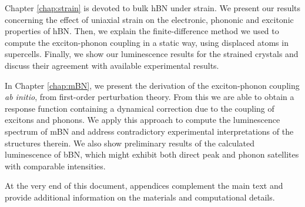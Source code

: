 Chapter \ref{chap:strain} is devoted to bulk \acrshort{hBN} under strain. We present our results concerning the effect of uniaxial strain on the electronic, phononic and excitonic properties of \acrshort{hBN}. Then, we explain the finite-difference method we used to compute the exciton-phonon coupling in a static way, using displaced atoms in supercells. Finally, we show our luminescence results for the strained crystals and discuss their agreement with available experimental results.

In Chapter \ref{chap:mBN}, we present the derivation of the exciton-phonon coupling \textit{ab initio}, from first-order perturbation theory. From this we are able to obtain a response function containing a dynamical correction due to the coupling of excitons and phonons. We apply this approach to compute the luminescence spectrum of \acrfull{mBN} and address contradictory experimental interpretations of the structures therein. We also show preliminary results of the calculated luminescence of \acrfull{bBN}, which might exhibit both direct peak and phonon satellites with comparable intensities.
 
At the very end of this document, appendices complement the main text and provide additional information on the materials and computational details.